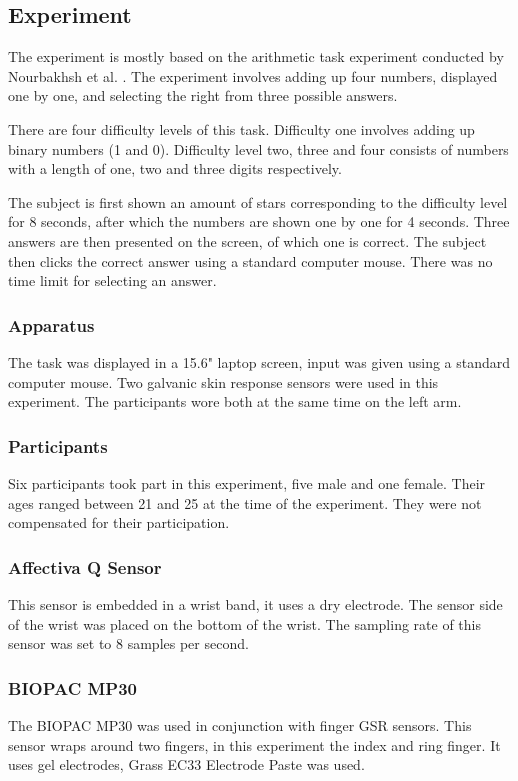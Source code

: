 \documentclass[12pt,fleqn,leqno,letterpaper]{article}
\begin{document}
\subsection{Experiment}
The experiment is mostly based on the arithmetic task experiment conducted by Nourbakhsh et al. \cite{Nourbakhsh2012}. The experiment involves adding up four numbers, displayed one by one, and selecting the right from three possible answers.

There are four difficulty levels of this task. Difficulty one involves adding up binary numbers (1 and 0). Difficulty level two, three and four consists of numbers with a length of one, two and three digits respectively.

The subject is first shown an amount of stars corresponding to the difficulty level for 8 seconds, after which the numbers are shown one by one for 4 seconds. Three answers are then presented on the screen, of which one is correct. The subject then clicks the correct answer using a standard computer mouse. There was no time limit for selecting an answer.


\subsubsection{Apparatus}
The task was displayed in a 15.6" laptop screen, input was given using a standard computer mouse.
Two galvanic skin response sensors were used in this experiment. The participants wore both at the same time on the left arm.

\subsubsection{Participants}
Six participants took part in this experiment, five male and one female. Their ages ranged between 21 and 25 at the time of the experiment. They were not compensated for their participation.


\subsubsection{Affectiva Q Sensor}
This sensor is embedded in a wrist band, it uses a dry electrode. The sensor side of the wrist was placed on the bottom of the wrist. The sampling rate of this sensor was set to 8 samples per second.

\subsubsection{BIOPAC MP30}
The BIOPAC MP30 was used in conjunction with finger GSR sensors. This sensor wraps around two fingers, in this experiment the index and ring finger. It uses gel electrodes, Grass EC33 Electrode Paste was used.
\end{document}
